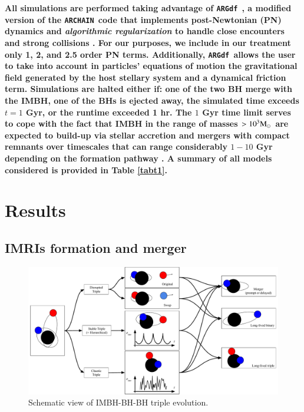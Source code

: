 \documentclass[article]{aa}
\newcommand{\Ms}{{\rm M}_\odot}
\newcommand{\ARGdf}{\texttt{ARGdf~}}
\newcommand{\ARCHAIN}{\texttt{ARCHAIN~}}
\begin{document}
{\bf 
All simulations are performed taking advantage of \ARGdf \citep{ASCD19}, a modified version of the \ARCHAIN code that implements post-Newtonian (PN) dynamics and {\it algorithmic regularization} to handle close encounters and strong collisions \citep{mikkola99,mikkola08}. For our purposes, we include in our treatment only 1, 2, and 2.5 order PN terms. Additionally, \ARGdf allows the user to take into account in particles' equations of motion the gravitational field generated by the host stellary system and a dynamical friction term. Simulations are halted either if: one of the two BH merge with the IMBH, one of the BHs is ejected away, the simulated time exceeds $t = 1$ Gyr, or the runtime exceeded 1 hr. The $1$ Gyr time limit serves to cope with the fact that IMBH in the range of masses $>10^3\Ms$ are expected to build-up via stellar accretion and mergers with compact remnants over timescales that can range considerably $1-10$ Gyr depending on the formation pathway \citep[see for instance][]{giersz15}. A summary of all models considered is provided in Table \ref{tabt1}.
}

\section{Results}
\label{res}

\subsection{IMRIs formation and merger}
\label{sec:imris}


\begin{figure}
    \centering
    \includegraphics[width=16cm]{Sketch_IMRI}
    \caption{Schematic view of IMBH-BH-BH triple evolution.}
    \label{fig:f3}
\end{figure}
\end{document}
